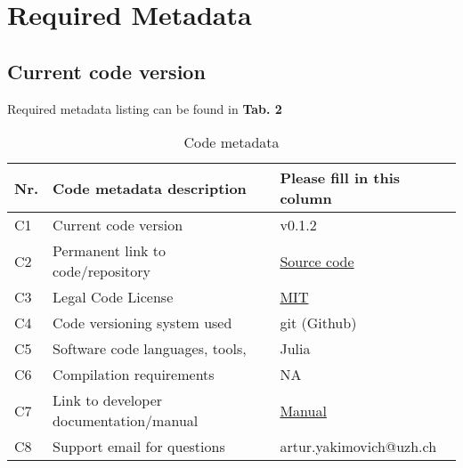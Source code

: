 \section{Required Metadata}

\subsection{Current code version}

Required metadata listing can be found in \textbf{Tab. 2}

\begin{table}
\begin{tabular}{lll}
\hline
\textbf{Nr.} & \textbf{Code metadata description} & \textbf{Please fill in this column} \\
\hline
C1 & Current code version & v0.1.2 \\
\hline
C2 & Permanent link to code/repository & \href{https://github.com/MatlabCompat/MatlabCompat.jl}{Source code} \\
\hline
C3 & Legal Code License   & \href{http://opensource.org/licenses/MIT}{MIT} \\
\hline
C4 & Code versioning system used & git (Github) \\
\hline
C5 & Software code languages, tools, & Julia \\
\hline
C6 & Compilation requirements & NA \\
\hline
C7 & Link to developer documentation/manual & \href{http://matlabcompat.github.io/help.html}{Manual}\\
\hline
C8 & Support email for questions & artur.yakimovich@uzh.ch\\
\hline
\end{tabular}
\caption{Code metadata}
\end{table}
  
  